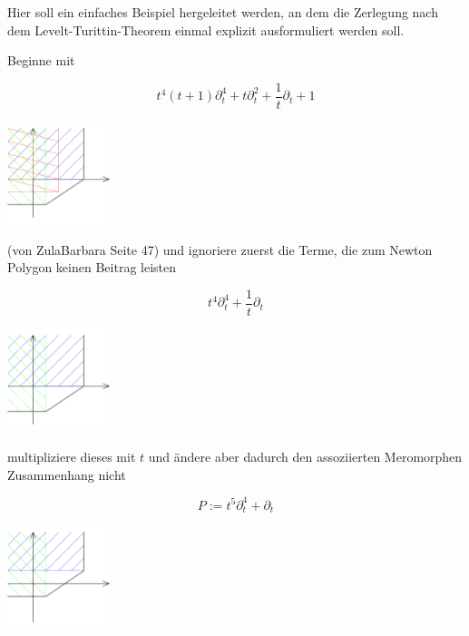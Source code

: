 
Hier soll ein einfaches Beispiel hergeleitet werden, an dem die Zerlegung nach
dem Levelt-Turittin-Theorem einmal explizit ausformuliert werden soll.

Beginne mit

\begin{minipage}[hbt]{0,49\textwidth}
  \[ t^4(t+1)\partial_t^4 + t\partial_t^2+\frac{1}{t}\partial_t+1 \]
\end{minipage}
\begin{minipage}[hbt]{0,49\textwidth}
  \begin{center}
    \includegraphics[width=3cm]{beispiele/img/e.png}
  \end{center}
\end{minipage}

(von ZulaBarbara Seite 47)
und ignoriere zuerst die Terme, die zum Newton Polygon keinen Beitrag leisten

\begin{minipage}[hbt]{0,49\textwidth}
  \[ t^4\partial_t^4 +\frac{1}{t}\partial_t \]
\end{minipage}
\begin{minipage}[hbt]{0,49\textwidth}
  \begin{center}
    \includegraphics[width=3cm]{beispiele/img/bar_e.png}
  \end{center}
\end{minipage}

multipliziere dieses mit $t$ und ändere aber dadurch den assoziierten
Meromorphen Zusammenhang nicht \cite[Chapter 5.1]{sabbah_cimpa90}

\begin{minipage}[hbt]{0,49\textwidth}
  \[ P:=t^5\partial_t^4 +\partial_t \]
\end{minipage}
\begin{minipage}[hbt]{0,49\textwidth}
  \begin{center} 
    \includegraphics[width=3cm]{beispiele/img/bar_e_times_x.png} 
  \end{center}
\end{minipage}

